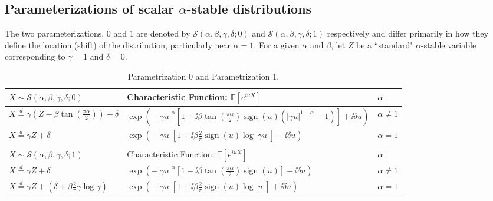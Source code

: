 \subsection*{Parameterizations of scalar $\alpha$-stable distributions}

The two parameterizations, 0 and 1 are denoted by $\mathcal{S}(\alpha, \beta, \gamma, \delta; 0)$ and $\mathcal{S}(\alpha, \beta, \gamma, \delta; 1)$ respectively and differ primarily in how they define the location (shift) of the distribution, particularly near $\alpha = 1$. For a given $\alpha$ and $\beta$, let $Z$ be a ``standard" $\alpha$-stable variable corresponding to $\gamma = 1$ and $\delta = 0$.
\begin{table}[!htb]
\begin{center}
\renewcommand{\arraystretch}{1.5}

\begin{tabular}{|l|l|l|} \hline
$X \sim \mathcal{S}(\alpha, \beta, \gamma, \delta; 0)$ & Characteristic Function: $\mathbb{E}[e^{iuX}]$ & $\alpha$ \\ \hline \hline
$X \overset{d}{=} \gamma \left( Z - \beta \tan\left( \frac{\pi \alpha}{2} \right) \right) + \delta$ & $\exp\left( -|\gamma u|^\alpha \left[ 1 + \ii\beta \tan\left( \frac{\pi \alpha}{2} \right) \operatorname{sign}(u)(|\gamma u|^{1 - \alpha} - 1) \right] + \ii \delta u \right)$ & $\alpha \neq 1$
\\
$X \overset{d}{=} \gamma Z + \delta$ & $\exp\left( -|\gamma u| \left[ 1 + \ii\beta \frac{2}{\pi} \operatorname{sign}(u) \log|\gamma u| \right] + \ii \delta u \right)$ & $\alpha = 1$
\\ \hline
 \multicolumn{3}{c}{} \\ \hline
$X \sim \mathcal{S}(\alpha, \beta, \gamma, \delta; 1)$ & Characteristic Function: $\mathbb{E}[e^{iuX}]$ & $\alpha$ \\ \hline \hline
$X \overset{d}{=} \gamma Z + \delta$ & $\exp\left( -|\gamma u|^\alpha \left[ 1 - \ii\beta \tan\left( \frac{\pi \alpha}{2} \right) \operatorname{sign}(u) \right] + \ii \delta u \right)$ & $\alpha \neq 1$
\\
$X \overset{d}{=} \gamma Z + \left( \delta + \beta \frac{2}{\pi} \gamma \log \gamma \right)$ & $\exp\left( -|\gamma u| \left[ 1 + \ii\beta \frac{2}{\pi} \operatorname{sign}(u) \log|u| \right] + \ii \delta u \right)$ & $\alpha = 1$
\\ \hline
\end{tabular}
\caption{Parametrization 0 and Parametrization 1. \label{eq:type1}}
\renewcommand{\arraystretch}{1}
\end{center}
\end{table}


